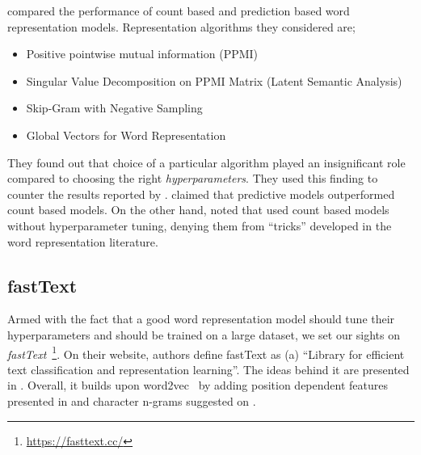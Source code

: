 
\textcite{levy_improving_2015} compared the performance of count based and prediction based word representation models.
Representation algorithms they considered are;
\begin{itemize}
    \item Positive pointwise mutual information (PPMI)~\cite{church_word_1990, bullinaria_extracting_2007}
    \item Singular Value Decomposition on PPMI Matrix (Latent Semantic Analysis)~\cite{deerwester_indexing_1990}
    \item Skip-Gram with Negative Sampling~\cite{mikolov_distributed_2013}
    \item Global Vectors for Word Representation~\cite{pennington_glove_2014}
\end{itemize}
They found out that choice of a particular algorithm played an insignificant role compared to choosing the right \emph{hyperparameters}.
They used this finding to counter the results reported by \textcite{baroni_dont_2014}.
\citeauthor{baroni_dont_2014} claimed that predictive models outperformed count based models.
On the other hand, \citeauthor{levy_improving_2015} noted that \citeauthor{baroni_dont_2014} used count based models without hyperparameter tuning, denying them from \enquote{tricks} developed in the word representation literature.

\subsection{fastText}%
\label{sub:fasttext}

Armed with the fact that a good word representation model should tune their hyperparameters and should be trained on a large dataset, we set our sights on \emph{fastText}~\footnote{\url{https://fasttext.cc/}}.
On their website, authors define fastText as (a) \enquote{Library for efficient text classification and representation learning}.
The ideas behind it are presented in \textcite{mikolov2018advances}.
Overall, it builds upon word2vec~\cite{mikolov_distributed_2013} by adding position dependent features presented in \textcite{mnih_learning_2013} and character n-grams suggested on \textcite{bojanowski_enriching_2016}.

